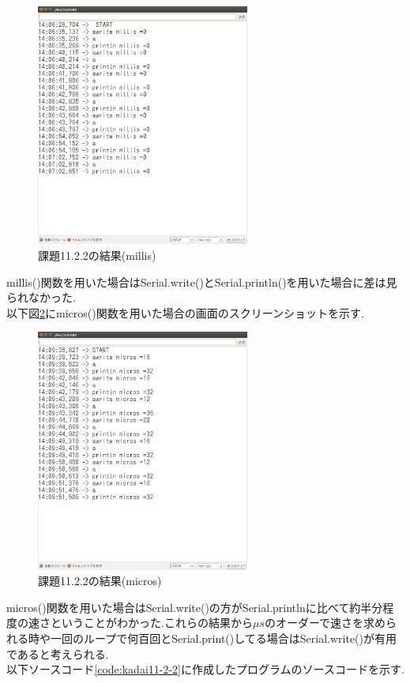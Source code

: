 \documentclass{jarticle}
\begin{document}
\begin{figure}[H]
\begin{center}
\includegraphics[width=7.0cm]{images/kadai11-2-2-millis.png}
\caption{課題11.2.2の結果(millis)}
\label{fig:kadai11-2-2-millis}
\end{center}
\end{figure}
millis()関数を用いた場合はSerial.write()とSerial.println()を用いた場合に差は見られなかった. \\
以下図\ref{fig:kadai11-2-2-micros}にmicros()関数を用いた場合の画面のスクリーンショットを示す.
\begin{figure}[H]
\begin{center}
\includegraphics[width=7.0cm]{images/kadai11-2-2-micros.png} 
\caption{課題11.2.2の結果(micros)}
\label{fig:kadai11-2-2-micros} 
\end{center} 
\end{figure} 
micros()関数を用いた場合はSerial.write()の方がSerial.printlnに比べて約半分程度の速さということがわかった.これらの結果から$\mu s$のオーダーで速さを求められる時や一回のループで何百回とSerial.print()してる場合はSerial.write()が有用であると考えられる. \\ 
以下ソースコード\ref{code:kadai11-2-2}に作成したプログラムのソースコードを示す. 

\end{document}

